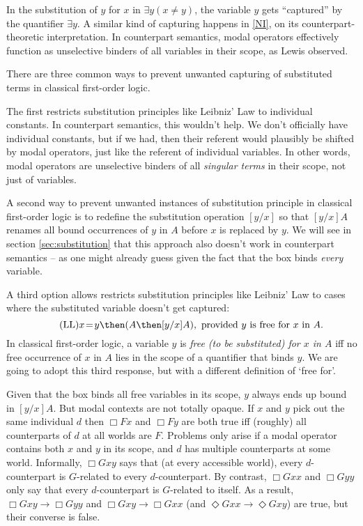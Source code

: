 \documentclass[11pt]{woarticle}
\theoremstyle{break}
\theoremstyle{nonumberplain}
\newcommand{\1}{\;\,|\;\,}
\begin{document}
In the substitution of $y$ for $x$ in $\exists y(x\!\not=\!y)$, the variable $y$
gets ``captured'' by the quantifier $\exists y$. A similar kind of capturing
happens in \eqref{NI}, on its counterpart-theoretic interpretation. In
counterpart semantics, modal operators effectively function as unselective
binders of all variables in their scope, as Lewis  observed.

There are three common ways to prevent unwanted capturing of substituted terms
in classical first-order logic.

The first restricts substitution principles like Leibniz' Law to individual
constants. In counterpart semantics, this wouldn't help. We don't officially
have individual constants, but if we had, then their referent would plausibly be
shifted by modal operators, just like the referent of individual variables. In
other words, modal operators are unselective binders of all \emph{singular
  terms} in their scope, not just of variables.

A second way to prevent unwanted instances of substitution principle in
classical first-order logic is to redefine the substitution operation $[y/x]$ so
that $[y/x]A$ renames all bound occurrences of $y$ in $A$ before $x$ is replaced
by $y$. We will see in section \ref{sec:substitution} that this approach also
doesn't work in counterpart semantics -- as one might already guess given the
fact that the box binds \emph{every} variable.

A third option allows restricts substitution principles like Leibniz' Law to
cases where the substituted variable doesn't get captured:
\begin{equation}\label{LL}\tag{LL}
  x\!=\!y \then (A \then [y/x]A), \text{ provided $y$ is free for $x$ in $A$}.
\end{equation}
In classical first-order logic, a variable $y$ is \emph{free (to be substituted)
  for $x$ in $A$} iff no free occurrence of $x$ in $A$ lies in the scope of a
quantifier that binds $y$. We are going to adopt this third response, but with a
different definition of `free for'.

Given that the box binds all free variables in its scope, $y$ always ends up
bound in $[y/x]A$. But modal contexts are not totally opaque. If $x$ and $y$
pick out the same individual $d$ then $\Box Fx$ and $\Box Fy$ are both true iff
(roughly) all counterparts of $d$ at all worlds are $F$. Problems only arise if
a modal operator contains both $x$ and $y$ in its scope, and $d$ has multiple
counterparts at some world. Informally, $\Box Gxy$ says that (at every
accessible world), every $d$-counterpart is $G$-related to every
$d$-counterpart. By contrast, $\Box Gxx$ and $\Box Gyy$ only say that every
$d$-counterpart is $G$-related to itself. As a result, $\Box Gxy \to \Box Gyy$
and $\Box Gxy \to \Box Gxx$ (and $\Diamond Gxx \to \Diamond Gxy$) are true, but
their converse is false.
\end{document}
